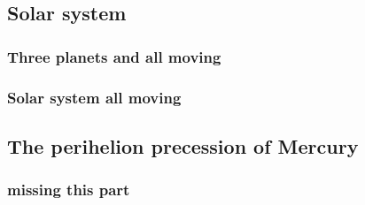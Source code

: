 \subsection{Solar system}


\subsubsection{Three planets and all moving}


\subsubsection{Solar system all moving}





\subsection{The perihelion precession of Mercury}

\subsubsection{missing this part}